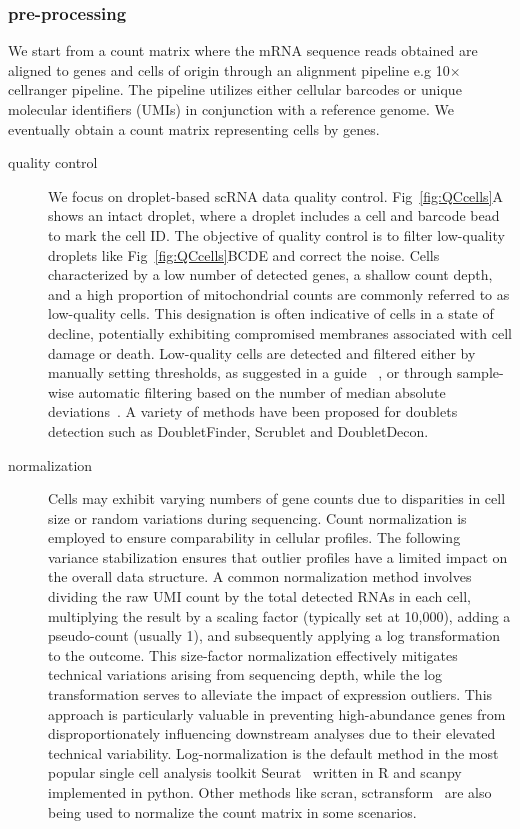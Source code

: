 \subsubsection{pre-processing}
We start from a count matrix where the mRNA sequence reads obtained are aligned to genes and cells of origin through an alignment pipeline e.g 10$\times$ cellranger pipeline. The pipeline utilizes either cellular barcodes or unique molecular identifiers (UMIs) in conjunction with a reference genome. We eventually obtain a count matrix representing cells by genes. 
\begin{description}
	\item[quality control] We focus on droplet-based scRNA data quality control. Fig~\ref{fig:QCcells}A shows an intact droplet, where a droplet includes a cell and barcode bead to mark the cell ID. The objective of quality control is to filter low-quality droplets like Fig~\ref{fig:QCcells}BCDE and correct the noise. Cells characterized by a low number of detected genes, a shallow count depth, and a high proportion of mitochondrial counts are commonly referred to as low-quality cells. This designation is often indicative of cells in a state of decline, potentially exhibiting compromised membranes associated with cell damage or death. Low-quality cells are detected and filtered either by manually setting thresholds, as suggested in a guide ~\citep{luecken2019current}, or through sample-wise automatic filtering based on the number of median absolute deviations~\citep{germain2020pipecomp}. A variety of methods have been proposed for doublets detection such as DoubletFinder, Scrublet and DoubletDecon\citep{mcginnis2019doubletfinder, wolock2019scrublet, depasquale2019doubletdecon}.
	\item[normalization]  Cells may exhibit varying numbers of gene counts due to disparities in cell size or random variations during sequencing. Count normalization is employed to ensure comparability in cellular profiles. The following variance stabilization ensures that outlier profiles have a limited impact on the overall data structure. A common normalization method involves dividing the raw UMI count by the total detected RNAs in each cell, multiplying the result by a scaling factor (typically set at 10,000), adding a pseudo-count (usually 1), and subsequently applying a log transformation to the outcome. This size-factor normalization effectively mitigates technical variations arising from sequencing depth, while the log transformation serves to alleviate the impact of expression outliers. This approach is particularly valuable in preventing high-abundance genes from disproportionately influencing downstream analyses due to their elevated technical variability. Log-normalization is the default method in the most popular single cell analysis toolkit Seurat~\citep{stuart2019seurat3} written in R and scanpy\citep{wolf2018scanpy} implemented in python. Other methods like scran, sctransform~\citep{l2016scran,hafemeister2019sctransform} are also being used to normalize the count matrix in some scenarios. 

\end{description}
